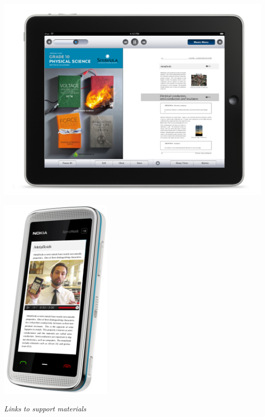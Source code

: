 \begin{center}
\begin{minipage}{0.4\textwidth}
\centering
\includegraphics[width=1\textwidth]{../title_images/ipad.jpg}
\end{minipage}
\begin{minipage}{0.4\textwidth}
\centering
\includegraphics[width=0.4\textwidth]{../title_images/phone.png}
\end{minipage}
\end{center}

\vspace*{2cm}


{\normalfont\sffamily\fontsize{22}\normalfont\itshape Links to support materials} \par


